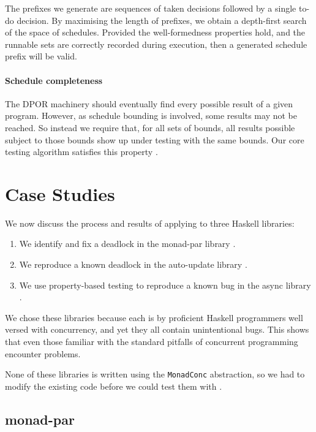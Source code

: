 The prefixes we generate are sequences of taken decisions followed by
a single to-do decision.  By maximising the length of prefixes, we
obtain a depth-first search of the space of schedules.  Provided the
well-formedness properties hold, and the runnable sets are correctly
recorded during execution, then a generated schedule prefix will be
valid.

\paragraph{Schedule completeness}
The DPOR machinery should eventually find every possible result of a
given program.  However, as schedule bounding is involved, some
results may not be reached.  So instead we require that, for all sets
of bounds, all results possible subject to those bounds show up under
testing with the same bounds.  Our core testing algorithm satisfies
this property \parencite{coons2013}.

\section{Case Studies}
\label{sec:dejafu-casestudies}

We now discuss the process and results of applying \dejafu{} to three
Haskell libraries:

\begin{enumerate}
\item We identify and fix a deadlock in the monad-par
  library \parencite{monad_par,marlow2011}.
\item We reproduce a known deadlock in the auto-update
  library \parencite{auto_update}.
\item We use property-based testing to reproduce a known bug in the
  async library \parencite{async}.
\end{enumerate}

We chose these libraries because each is by proficient Haskell
programmers well versed with concurrency, and yet they all contain
unintentional bugs.  This shows that even those familiar with the
standard pitfalls of concurrent programming encounter problems.

None of these libraries is written using the \verb|MonadConc|
abstraction, so we had to modify the existing code before we could
test them with \dejafu{}.
\subsection{monad-par}
\label{sec:dejafu-casestudies-par}

